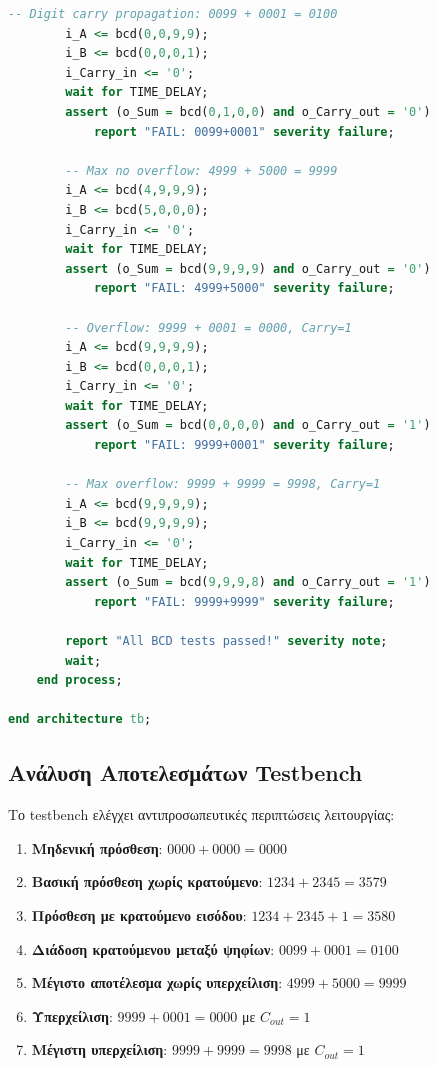 \documentclass[12pt]{article}
\begin{document}
\begin{lstlisting}[language=VHDL]
        -- Digit carry propagation: 0099 + 0001 = 0100
        i_A <= bcd(0,0,9,9);
        i_B <= bcd(0,0,0,1);
        i_Carry_in <= '0';
        wait for TIME_DELAY;
        assert (o_Sum = bcd(0,1,0,0) and o_Carry_out = '0')
            report "FAIL: 0099+0001" severity failure;

        -- Max no overflow: 4999 + 5000 = 9999
        i_A <= bcd(4,9,9,9);
        i_B <= bcd(5,0,0,0);
        i_Carry_in <= '0';
        wait for TIME_DELAY;
        assert (o_Sum = bcd(9,9,9,9) and o_Carry_out = '0')
            report "FAIL: 4999+5000" severity failure;

        -- Overflow: 9999 + 0001 = 0000, Carry=1
        i_A <= bcd(9,9,9,9);
        i_B <= bcd(0,0,0,1);
        i_Carry_in <= '0';
        wait for TIME_DELAY;
        assert (o_Sum = bcd(0,0,0,0) and o_Carry_out = '1')
            report "FAIL: 9999+0001" severity failure;

        -- Max overflow: 9999 + 9999 = 9998, Carry=1
        i_A <= bcd(9,9,9,9);
        i_B <= bcd(9,9,9,9);
        i_Carry_in <= '0';
        wait for TIME_DELAY;
        assert (o_Sum = bcd(9,9,9,8) and o_Carry_out = '1')
            report "FAIL: 9999+9999" severity failure;

        report "All BCD tests passed!" severity note;
        wait;
    end process;

end architecture tb;
\end{lstlisting}

\subsection*{Ανάλυση Αποτελεσμάτων Testbench}

Το testbench ελέγχει αντιπροσωπευτικές περιπτώσεις λειτουργίας:

\begin{enumerate}
    \item \textbf{Μηδενική πρόσθεση}: $0000 + 0000 = 0000$
    \item \textbf{Βασική πρόσθεση χωρίς κρατούμενο}: $1234 + 2345 = 3579$
    \item \textbf{Πρόσθεση με κρατούμενο εισόδου}: $1234 + 2345 + 1 = 3580$
    \item \textbf{Διάδοση κρατούμενου μεταξύ ψηφίων}: $0099 + 0001 = 0100$
    \item \textbf{Μέγιστο αποτέλεσμα χωρίς υπερχείλιση}: $4999 + 5000 = 9999$
    \item \textbf{Υπερχείλιση}: $9999 + 0001 = 0000$ με $C_{out} = 1$
    \item \textbf{Μέγιστη υπερχείλιση}: $9999 + 9999 = 9998$ με $C_{out} = 1$
\end{enumerate}
\end{document}
